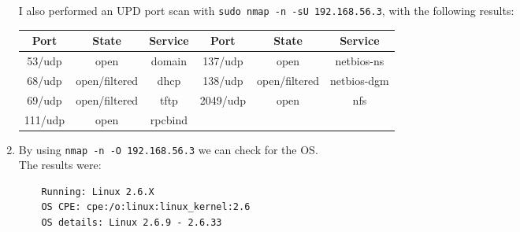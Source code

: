 \begin{enumerate}
    I also performed an UPD port scan with \texttt{sudo nmap -n -sU 192.168.56.3}, with the following results:
    \begin{table}[!h]
        \centering
        \begin{tabular}{|c|c|c||c|c|c|}
        \hline
        \textbf{Port} & \textbf{State} & \textbf{Service} & \textbf{Port} & \textbf{State} & \textbf{Service} \\ \hline
        53/udp        & open           & domain           & 137/udp       & open           & netbios-ns       \\ \hline
        68/udp        & open/filtered  & dhcp             & 138/udp       & open/filtered  & netbios-dgm      \\ \hline
        69/udp        & open/filtered  & tftp             & 2049/udp      & open           & nfs              \\ \hline
        111/udp       & open           & rpcbind          &               &                &                  \\ \hline
        \end{tabular}
        \end{table}

    \item By using \texttt{nmap -n -O 192.168.56.3} we can check for the OS.\\
    The results were:
    \begin{verbatim}
    Running: Linux 2.6.X
    OS CPE: cpe:/o:linux:linux_kernel:2.6
    OS details: Linux 2.6.9 - 2.6.33
    \end{verbatim}


\end{enumerate}